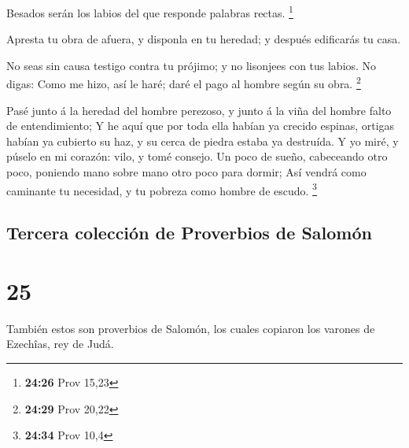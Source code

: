  Besados serán los labios del que responde palabras
rectas. \footnote{\textbf{24:26} Prov 15,23}

 Apresta tu obra de afuera, y disponla en tu heredad; y
después edificarás tu casa.

 No seas sin causa testigo contra tu prójimo; y no
lisonjees con tus labios.  No digas: Como me hizo, así le
haré; daré el pago al hombre según su obra. \footnote{\textbf{24:29}
  Prov 20,22}

 Pasé junto á la heredad del hombre perezoso, y junto á
la viña del hombre falto de entendimiento;  Y he aquí que
por toda ella habían ya crecido espinas, ortigas habían ya cubierto su
haz, y su cerca de piedra estaba ya destruída.  Y yo
miré, y púselo en mi corazón: vilo, y tomé consejo.  Un
poco de sueño, cabeceando otro poco, poniendo mano sobre mano otro poco
para dormir;  Así vendrá como caminante tu necesidad, y
tu pobreza como hombre de escudo. \footnote{\textbf{24:34} Prov 10,4}

\hypertarget{tercera-colecciuxf3n-de-proverbios-de-salomuxf3n}{%
\subsection{Tercera colección de Proverbios de
Salomón}\label{tercera-colecciuxf3n-de-proverbios-de-salomuxf3n}}

\hypertarget{section-24}{%
\section{25}\label{section-24}}

 También estos son proverbios de Salomón, los cuales
copiaron los varones de Ezechîas, rey de Judá.

